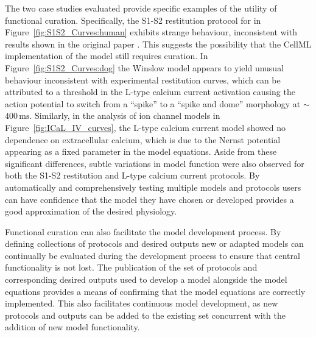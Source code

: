 \documentclass[preprint,authoryear,12pt]{elsarticle}
\newcommand{\vu}[2]{\ensuremath{#1\,\mathrm{#2}}}
\newcommand{\changed}[1]{#1}
\begin{document}
\changed{The two case studies evaluated provide specific examples of the utility of functional curation.
Specifically, the S1-S2 restitution protocol for \citeauthor{grandi2010novel} in Figure~\ref{fig:S1S2_Curves:human} exhibits strange behaviour, inconsistent with results shown in the original paper \citep[][Figure 5C]{grandi2010novel}.
This suggests the possibility that the CellML implementation of the model still requires curation.
In Figure~\ref{fig:S1S2_Curves:dog} the Winslow model appears to yield unusual behaviour inconsistent with experimental restitution curves, which can be attributed to a threshold in the L-type calcium current activation causing the action potential to switch from a ``spike'' to a ``spike and dome'' morphology at $\sim$\vu{400}{ms}.
Similarly, in the analysis of ion channel models in Figure~\ref{fig:ICaL_IV_curves}, the \citet{bondarenko2004computer} L-type calcium current model showed no dependence on extracellular calcium, which is due to the Nernst potential appearing as a fixed parameter in the model equations.
Aside from these significant differences, subtle variations in model function were also observed for both the S1-S2 restitution and L-type calcium current protocols.
By automatically and comprehensively testing multiple models and protocols users can have confidence that the model they have chosen or developed provides a good approximation of the desired physiology.}


Functional curation can also facilitate the model development process. 
By defining collections of protocols and desired outputs new or adapted models can continually be evaluated during the development process to ensure that central functionality is not lost.
The publication of the set of protocols and corresponding desired outputs used to develop a model alongside the model equations provides a means of confirming that the model equations are correctly implemented.
This also facilitates continuous model development, as new protocols and outputs can be added to the existing set concurrent with the addition of new model functionality.
\end{document}
